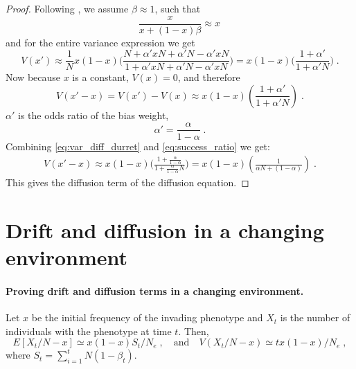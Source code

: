 \documentclass[12pt]{extarticle}
\begin{document}
\begin{appendices}
\begin{proof}
Following \citet[ch~7.2]{durret}, we assume $\beta \approx 1$, such that
\begin{equation}
\frac{x}{x + (1-x)\beta} \approx x \,
\end{equation}
and for the entire variance expression we get
\begin{equation}
V(x') \approx  \frac{1}{N} x(1-x)
\Big(\frac{N + \alpha' xN + \alpha' N - \alpha' xN}{1 + \alpha' xN + \alpha' N - \alpha' xN}\Big)
= x(1-x)\Big(\frac{1 + \alpha'}{1 + \alpha' N}\Big) \;.
\end{equation}
Now because $x$ is a constant, $V(x) = 0$, and therefore
\begin{equation}\label{eq:var_diff_durret}
V(x'-x) = V(x') - V(x) \approx  x(1-x)(\frac{1 + \alpha'}{1 + \alpha' N}) \;.
\end{equation}
$\alpha'$ is the odds ratio of the bias weight, 
\begin{equation}\label{eq:success_ratio}
\alpha' = \frac{\alpha}{1-\alpha} \;.
\end{equation}
Combining \cref{eq:var_diff_durret} and \cref{eq:success_ratio} we get:
\begin{equation}\label{eq:const_var}
\begin{split}
V(x'-x) \approx x(1-x)\Big(\frac{1 + \frac{\alpha}{1-\alpha}}{1 + \frac{\alpha}{1-\alpha} N}\Big)
  = x(1-x)(\frac{1}{\alpha N + (1-\alpha)}) \;.
\end{split}
\end{equation}
This gives the diffusion term of the diffusion equation.
\end{proof}

\section{Drift and diffusion in a changing environment} \label{sec:drift_diff_chang}
\paragraph{Proving drift and diffusion terms in a changing environment.}
Let $x$ be the initial frequency of the invading phenotype and $X_t$ is the number of individuals with the phenotype at time $t$.
Then,
\begin{equation*}
E[X_t/N - x] \simeq x(1-x) S_t / N_e \;, 
\quad
\text{and}
\quad
V(X_t/N-x) \simeq  t x(1-x) / N_e \;,
\end{equation*}
where $S_t=\sum\limits_{i=1}^{t} N (1-\beta_t)$.



\end{appendices}
\end{document}
